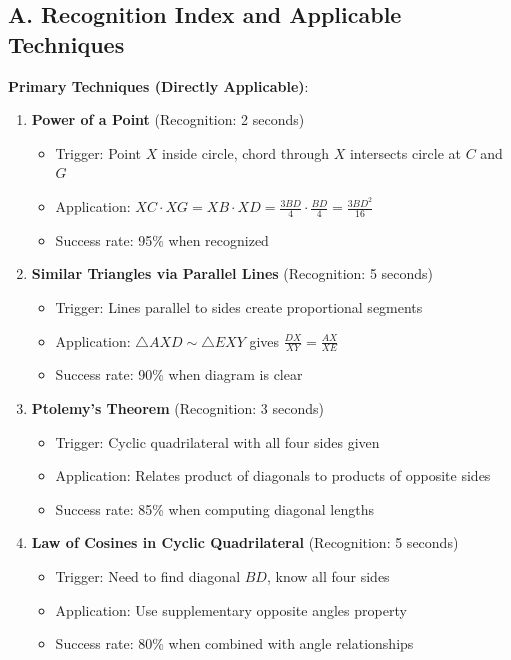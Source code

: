 \documentclass[]{article}
\begin{document}
\begin{techniquesbox}
\subsection*{A. Recognition Index and Applicable Techniques}

\textbf{Primary Techniques (Directly Applicable)}:
\begin{enumerate}
    \item \textbf{Power of a Point} (Recognition: 2 seconds)
    \begin{itemize}
        \item Trigger: Point $X$ inside circle, chord through $X$ intersects circle at $C$ and $G$
        \item Application: $XC \cdot XG = XB \cdot XD = \frac{3BD}{4} \cdot \frac{BD}{4} = \frac{3BD^2}{16}$
        \item Success rate: 95\% when recognized
    \end{itemize}
    
    \item \textbf{Similar Triangles via Parallel Lines} (Recognition: 5 seconds)
    \begin{itemize}
        \item Trigger: Lines parallel to sides create proportional segments
        \item Application: $\triangle AXD \sim \triangle EXY$ gives $\frac{DX}{XY} = \frac{AX}{XE}$
        \item Success rate: 90\% when diagram is clear
    \end{itemize}
    
    \item \textbf{Ptolemy's Theorem} (Recognition: 3 seconds)
    \begin{itemize}
        \item Trigger: Cyclic quadrilateral with all four sides given
        \item Application: Relates product of diagonals to products of opposite sides
        \item Success rate: 85\% when computing diagonal lengths
    \end{itemize}
    
    \item \textbf{Law of Cosines in Cyclic Quadrilateral} (Recognition: 5 seconds)
    \begin{itemize}
        \item Trigger: Need to find diagonal $BD$, know all four sides
        \item Application: Use supplementary opposite angles property
        \item Success rate: 80\% when combined with angle relationships
    \end{itemize}
\end{enumerate}


\end{techniquesbox}
\end{document}
